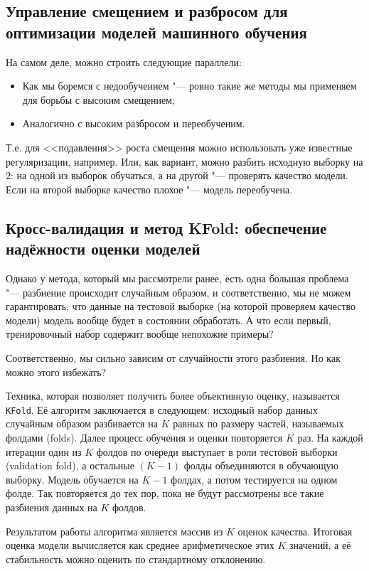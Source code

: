 \subsection*{Управление смещением и разбросом для оптимизации моделей машинного обучения}

На самом деле, можно строить следующие параллели:
\begin{itemize}
    \item Как мы боремся с недообучением "--- ровно такие же методы мы применяем для борьбы с высоким смещением;
    \item Аналогично с высоким разбросом и переобученим.
\end{itemize}

Т.е. для <<подавления>> роста смещения можно использовать уже известные регуляризации, например. Или, как вариант, можно разбить исходную выборку на 2: на одной из выборок обучаться, а на другой "--- проверять качество модели. Если на второй выборке качество плохое "--- модель переобучена.

\subsection*{Кросс-валидация и метод KFold: обеспечение надёжности оценки моделей}

Однако у метода, который мы рассмотрели ранее, есть одна большая проблема "--- разбиение происходит случайным образом, и соответственно, мы не можем гарантировать, что данные на тестовой выборке (на которой проверяем качество модели) модель вообще будет в состоянии обработать. А что если первый, тренировочный набор содержит вообще непохожие примеры?

Соответственно, мы сильно зависим от случайности этого разбиения. Но как можно этого избежать?

Техника, которая позволяет получить более объективную оценку, называется \texttt{KFold}. Её алгоритм заключается в следующем: исходный набор данных случайным образом разбивается на $K$ равных по размеру частей, называемых фолдами (folds). Далее процесс обучения и оценки повторяется $K$ раз. На каждой итерации один из $K$ фолдов по очереди выступает в роли тестовой выборки (validation fold), а остальные $(K-1)$ фолды объединяются в обучающую выборку. Модель обучается на $K-1$ фолдах, а потом тестируется на одном фолде. Так повторяется до тех пор, пока не будут рассмотрены все такие разбиения данных на $K$ фолдов. 

Результатом работы алгоритма является массив из $K$ оценок качества. Итоговая оценка модели вычисляется как среднее арифметическое этих $K$ значений, а её стабильность можно оценить по стандартному отклонению.